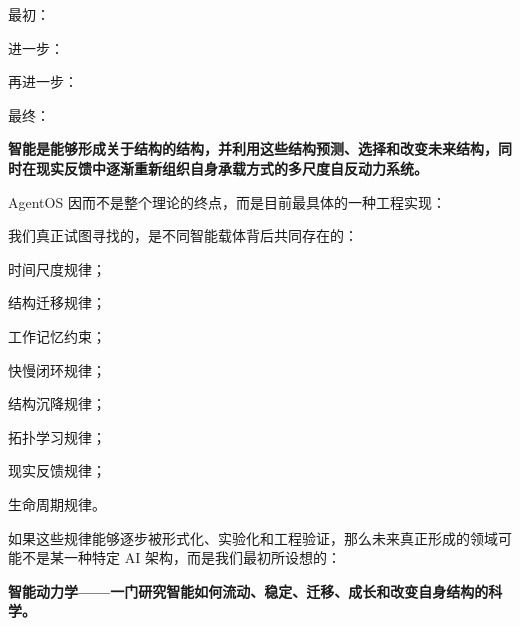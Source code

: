 最初：

\begin{statementbox}
\centering
{}
\end{statementbox}

进一步：

\begin{statementbox}
\centering
{}
\end{statementbox}

再进一步：

\begin{statementbox}
\centering
{}
\end{statementbox}

最终：

\begin{statementbox}
\bfseries
智能是能够形成关于结构的结构，并利用这些结构预测、选择和改变未来结构，同时在现实反馈中逐渐重新组织自身承载方式的多尺度自反动力系统。
\end{statementbox}

AgentOS 因而不是整个理论的终点，而是目前最具体的一种工程实现：

\begin{statementbox}
\centering
{}
\end{statementbox}

我们真正试图寻找的，是不同智能载体背后共同存在的：

时间尺度规律；

结构迁移规律；

工作记忆约束；

快慢闭环规律；

结构沉降规律；

拓扑学习规律；

现实反馈规律；

生命周期规律。

如果这些规律能够逐步被形式化、实验化和工程验证，那么未来真正形成的领域可能不是某一种特定 AI 架构，而是我们最初所设想的：

\begin{proposition*}
\bfseries 智能动力学——一门研究智能如何流动、稳定、迁移、成长和改变自身结构的科学。
\end{proposition*}









